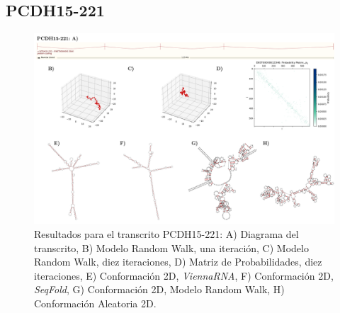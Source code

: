 \documentclass[a4paper,11pt,titlepage]{article}
\theoremstyle{definition}
\begin{document}
\subsection*{PCDH15-221}\label{subsec:gene2}

\begin{figure}[H]
    \centering
    \includegraphics[width=\textwidth]{images/PCDH15-221_full.png}
    \small{\caption{Resultados para el transcrito PCDH15-221: A) Diagrama del transcrito, B) Modelo Random Walk, una iteración, C) Modelo Random Walk, diez iteraciones, D) Matriz de Probabilidades, diez iteraciones, E) Conformación 2D, \textit{ViennaRNA}, F) Conformación 2D, \textit{SeqFold}, G) Conformación 2D, Modelo Random Walk, H) Conformación Aleatoria 2D.}}\normalsize
    \label{fig:PCDH15-221-diag}
\end{figure}
\end{document}
